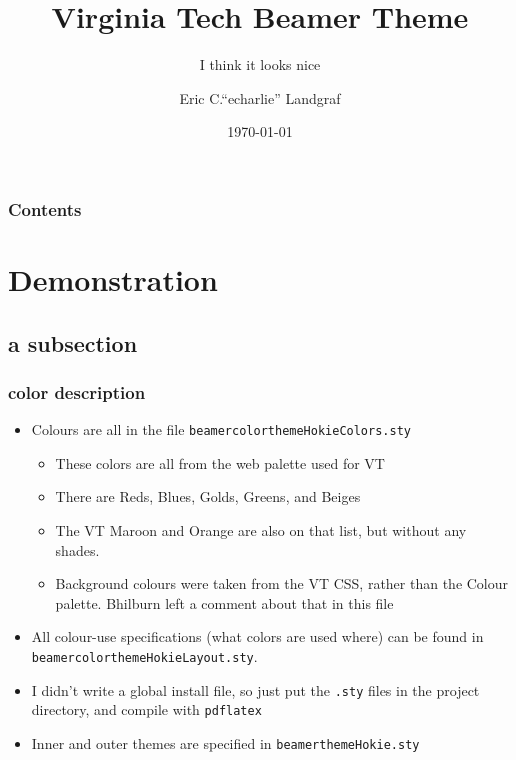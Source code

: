 \documentclass[aspectratio=1610,bigger,utf8]{beamer}
\title{Virginia Tech Beamer Theme}
\subtitle{I think it looks nice}
\author{Eric C.``echarlie'' Landgraf}
\institute{NI\&S}
\date{\today}
\begin{document}
\frame{\titlepage}

\begin{frame}
	\frametitle{Contents}
	\tableofcontents[hideallsubsections]

\end{frame}

\section{Demonstration}
\subsection{a subsection}
\begin{frame}
	\frametitle{color description}
	\begin{itemize}
		\item Colours are all in the file \texttt{beamercolorthemeHokieColors.sty}
			\begin{itemize}
				\item These colors are all from the web palette used for VT
				\item There are Reds, Blues, Golds, Greens, and Beiges
				\item The VT Maroon and Orange are also on that list, but without
					any shades.
				\item Background colours were taken from the VT CSS, rather than
					the Colour palette. Bhilburn left a comment about that
					in this file
			\end{itemize}
		\item All colour-use specifications (what colors are used where) can be found in
			\texttt{beamercolorthemeHokieLayout.sty}.
		\item I didn't write a global install file, so just put the \texttt{.sty} files
			in the project directory, and compile with \texttt{pdflatex}
		\item Inner and outer themes are specified in \texttt{beamerthemeHokie.sty}
	\end{itemize}
\end{frame}
\end{document}
